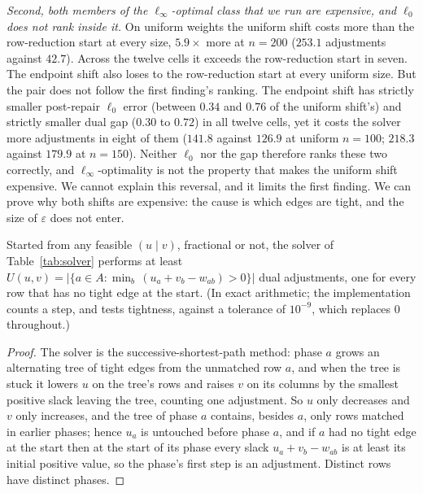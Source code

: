 \emph{Second, both members of the $\ell_\infty$-optimal class that we run are expensive, and
$\ell_0$ does not rank inside it.} On uniform weights the uniform shift costs more than the
row-reduction start at every size, $5.9\times$ more at $n = 200$ ($253.1$ adjustments against
$42.7$). Across the twelve cells it exceeds the row-reduction start in seven. The endpoint shift also loses to the row-reduction start at every uniform size. But
the pair does not follow the first finding's ranking. The endpoint shift has strictly smaller post-repair $\ell_0$ error (between $0.34$ and
$0.76$ of the uniform shift's) and strictly smaller dual gap ($0.30$ to $0.72$) in all
twelve cells, yet it costs the solver more adjustments in eight of them ($141.8$ against $126.9$ at
uniform $n = 100$; $218.3$ against $179.9$ at $n = 150$). Neither $\ell_0$ nor the gap therefore
ranks these two correctly, and $\ell_\infty$-optimality is not the property that makes the
uniform shift expensive. We cannot explain this reversal, and it limits the first finding. We can
prove why both shifts are expensive: the cause is which edges are tight, and the size of
$\varepsilon$ does not enter.

\begin{proposition}\label{prop:tightrows}
Started from any feasible $(u \mid v)$, fractional or not, the solver of Table~\ref{tab:solver}
performs at least $U(u,v) = |\{a \in A : \min_b\, (u_a + v_b - w_{ab}) > 0\}|$ dual adjustments, one for every row that has no tight edge at the start. (In exact arithmetic; the implementation counts a step, and tests tightness, against a tolerance of $10^{-9}$, which replaces $0$ throughout.)
\end{proposition}
\begin{proof}
The solver is the successive-shortest-path method: phase $a$ grows an alternating tree of tight
edges from the unmatched row $a$, and when the tree is stuck it lowers $u$ on the tree's rows and
raises $v$ on its columns by the smallest positive slack leaving the tree, counting one adjustment.
So $u$ only decreases and $v$ only increases, and the tree of phase $a$ contains, besides $a$,
only rows matched in earlier phases; hence $u_a$ is untouched before phase $a$, and if $a$ had no
tight edge at the start then at the start of its phase every slack $u_a + v_b - w_{ab}$ is at
least its initial positive value, so the phase's first step is an adjustment. Distinct rows have
distinct phases.
\end{proof}

